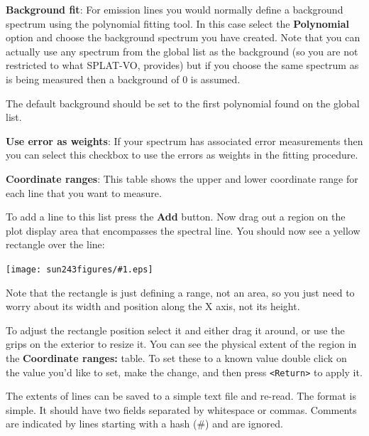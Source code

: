 \documentclass[twoside,11pt]{article}
\newcommand{\htmladdimg}[1]{}
\newcommand{\latexhtml}[2]{#1}
\renewcommand{\_}{\texttt{\symbol{95}}}
\newcommand{\SPLAT}{\textsf{SPLAT-VO}}
\newcommand{\mainfigure}[1]
{\begin{center}
 \latexhtml{\texttt{[image: sun243\_figures/\#1.eps]}}{\htmladdimg{#1.gif}}
 \end{center}
}
\newcommand{\labelitem}[1]{\textbf{#1}}
\newcommand{\hitext}[1]{\texttt{#1}}
\begin{document}
\labelitem{Background fit}: For emission lines you would normally
define a background spectrum using the polynomial fitting tool. In
this case select the \labelitem{Polynomial} option and choose the
background spectrum you have created. Note that you can actually use
any spectrum from the global list as the background (so you are not
restricted to what \SPLAT, provides) but if you choose the same
spectrum as is being measured then a background of $0$ is assumed.

The default background should be set to the first polynomial found on
the global list.

\labelitem{Use error as weights}: If your spectrum has associated
error measurements then you can select this checkbox to use the errors
as weights in the fitting procedure.

\labelitem{Coordinate ranges}: This table shows the upper and lower
coordinate range for each line that you want to measure.

To add a line to this list press the \labelitem{Add} button. Now drag
out a region on the plot display area that encompasses the spectral
line. You should now see a yellow rectangle over the line:

\mainfigure{linefitplotwindow}

Note that the rectangle is just defining a range, not an area, so you
just need to worry about its width and position along the X axis, not
its height.

To adjust the rectangle position select it and either drag it around,
or use the grips on the exterior to resize it. You can see the
physical extent of the region in the \labelitem{Coordinate ranges:}
table. To set these to a known value double click on the value you'd
like to set, make the change, and then press \hitext{<Return>} to
apply it.

The extents of lines can be saved to a simple text file and
re-read. The format is simple. It should have two fields separated by
whitespace or commas. Comments are indicated by lines starting with a
hash (\#) and are ignored.
\end{document}
